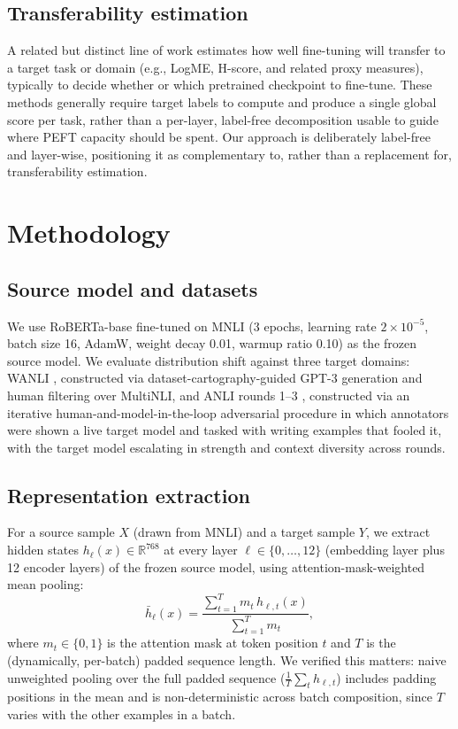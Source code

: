 \documentclass[conference]{IEEEtran}
\begin{document}
\subsection{Transferability estimation}
A related but distinct line of work estimates how well fine-tuning will transfer to a target task or domain (e.g., LogME, H-score, and related proxy measures), typically to decide whether or which pretrained checkpoint to fine-tune. These methods generally require target labels to compute and produce a single global score per task, rather than a per-layer, label-free decomposition usable to guide where PEFT capacity should be spent. Our approach is deliberately label-free and layer-wise, positioning it as complementary to, rather than a replacement for, transferability estimation.

\section{Methodology}

\subsection{Source model and datasets}
We use RoBERTa-base fine-tuned on MNLI \cite{williams2018mnli} (3 epochs, learning rate $2\times10^{-5}$, batch size 16, AdamW, weight decay 0.01, warmup ratio 0.10) as the frozen source model. We evaluate distribution shift against three target domains: WANLI \cite{liu2022wanli}, constructed via dataset-cartography-guided GPT-3 generation and human filtering over MultiNLI, and ANLI rounds 1--3 \cite{nie2020anli}, constructed via an iterative human-and-model-in-the-loop adversarial procedure in which annotators were shown a live target model and tasked with writing examples that fooled it, with the target model escalating in strength and context diversity across rounds.

\subsection{Representation extraction}
\label{sec:methodology-reps}
For a source sample $X$ (drawn from MNLI) and a target sample $Y$, we extract hidden states $h_\ell(x) \in \mathbb{R}^{768}$ at every layer $\ell \in \{0,\ldots,12\}$ (embedding layer plus 12 encoder layers) of the frozen source model, using attention-mask-weighted mean pooling:
\begin{equation}
\bar h_\ell(x) = \frac{\sum_{t=1}^{T} m_t \, h_{\ell,t}(x)}{\sum_{t=1}^{T} m_t},
\end{equation}
where $m_t \in \{0,1\}$ is the attention mask at token position $t$ and $T$ is the (dynamically, per-batch) padded sequence length. We verified this matters: naive unweighted pooling over the full padded sequence ($\frac{1}{T}\sum_t h_{\ell,t}$) includes padding positions in the mean and is non-deterministic across batch composition, since $T$ varies with the other examples in a batch.
\end{document}

